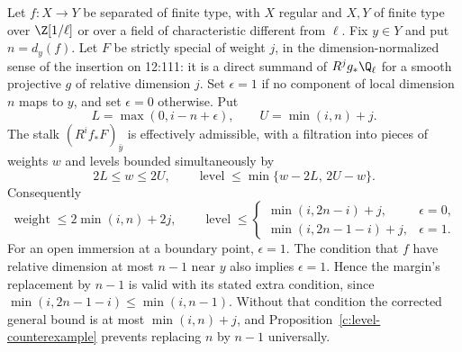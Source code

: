 \begin{theorem}
\label{c:general-level-bound}
Let $f:X\to Y$ be separated of finite type, with $X$ regular and $X,Y$ of finite type over $\Z[1/\ell]$ or over a field of characteristic different from $\ell$. Fix $y\in Y$ and put $n=d_y(f)$. Let $F$ be strictly special of weight $j$, in the dimension-normalized sense of the insertion on 12:111: it is a direct summand of $R^jg_*\Q_\ell$ for a smooth projective $g$ of relative dimension $j$. Set $\epsilon=1$ if no component of local dimension $n$ maps to $y$, and set $\epsilon=0$ otherwise. Put
\[
 L=\max(0,i-n+\epsilon),\qquad U=\min(i,n)+j.
\]
The stalk $(R^if_*F)_{\bar y}$ is effectively admissible, with a filtration into pieces of weights $w$ and levels bounded simultaneously by
\begin{equation}
\label{c:weight-level-polygon}
 2L\leq w\leq2U,
 \qquad \operatorname{level}\leq\min\{w-2L,\,2U-w\}.
\end{equation}
Consequently
\[
 \operatorname{weight}\leq2\min(i,n)+2j,
 \qquad
 \operatorname{level}\leq
 \begin{cases}
 \min(i,2n-i)+j,&\epsilon=0,\\
 \min(i,2n-1-i)+j,&\epsilon=1.
 \end{cases}
\]
For an open immersion at a boundary point, $\epsilon=1$. The condition that $f$ have relative dimension at most $n-1$ near $y$ also implies $\epsilon=1$. Hence the margin's replacement by $n-1$ is valid with its stated extra condition, since $\min(i,2n-1-i)\leq\min(i,n-1)$. Without that condition the corrected general bound is at most $\min(i,n)+j$, and Proposition~\ref{c:level-counterexample} prevents replacing $n$ by $n-1$ universally.
\end{theorem}

